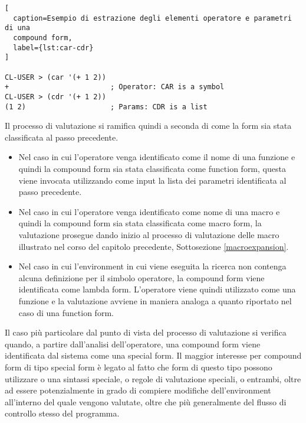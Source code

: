 \begin{lstlisting}[
  caption=Esempio di estrazione degli elementi operatore e parametri di una
  compound form,
  label={lst:car-cdr}
]

CL-USER > (car '(+ 1 2))
+                        ; Operator: CAR is a symbol
CL-USER > (cdr '(+ 1 2))
(1 2)                    ; Params: CDR is a list

\end{lstlisting}

Il processo di valutazione si ramifica quindi a seconda di come la form sia
stata classificata al passo precedente.

\begin{itemize}

\item Nel caso in cui l’operatore venga identificato come il nome di una
funzione e quindi la compound form sia stata classificata come function form,
questa viene invocata utilizzando come input la lista dei parametri identificata
al passo precedente.

\item Nel caso in cui l’operatore venga identificato come nome di una macro e
quindi la compound form sia stata classificata come macro form, la valutazione
prosegue dando inizio al processo di valutazione delle macro illustrato nel
corso del capitolo precedente, Sottosezione \ref{macroexpansion}.

\item Nel caso in cui l’environment in cui viene eseguita la ricerca non
contenga alcuna definizione per il simbolo operatore, la compound form viene
identificata come lambda form. L’operatore viene quindi utilizzato come una
funzione e la valutazione avviene in maniera analoga a quanto riportato nel caso
di una function form.

\end{itemize}

Il caso più particolare dal punto di vista del processo di valutazione si
verifica quando, a partire dall’analisi dell’operatore, una compound form viene
identificata dal sistema come una special form. Il maggior interesse per
compound form di tipo special form è legato al fatto che form di questo tipo
possono utilizzare o una sintassi speciale, o regole di valutazione speciali, o
entrambi, oltre ad essere potenzialmente in grado di compiere modifiche
dell’environment all’interno del quale vengono valutate, oltre che più
generalmente del flusso di controllo stesso del programma.

